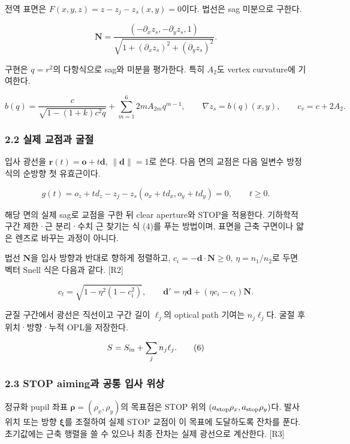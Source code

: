 \documentclass[
  a4paper,
]{article}
\begin{document}
전역 표면은 \(F(x,y,z)=z-z_j-z_s(x,y)=0\)이다. 법선은 sag 미분으로
구한다.

\[
\mathbf N=\frac{(-\partial_xz_s,-\partial_yz_s,1)}
 {\sqrt{1+(\partial_xz_s)^2+(\partial_yz_s)^2}}.
\tag{2}
\]

구현은 \(q=r^2\)의 다항식으로 sag와 미분을 평가한다. 특히 \(A_2\)도
vertex curvature에 기여한다.

\[
b(q)=\frac{c}{\sqrt{1-(1+k)c^2q}}
 +\sum_{m=1}^{6}2mA_{2m}q^{m-1},\qquad
\nabla z_s=b(q)(x,y),\qquad c_v=c+2A_2.
\tag{3}
\]

\hypertarget{uxc2e4uxc81c-uxad50uxc810uxacfc-uxad74uxc808}{%
\subsubsection{2.2 실제 교점과
굴절}\label{uxc2e4uxc81c-uxad50uxc810uxacfc-uxad74uxc808}}

입사 광선을 \(\mathbf r(t)=\mathbf o+t\mathbf d\), \(\|\mathbf d\|=1\)로
쓴다. 다음 면의 교점은 다음 일변수 방정식의 순방향 첫 유효근이다.

\[
g(t)=o_z+td_z-z_j-z_s(o_x+td_x,o_y+td_y)=0,
\qquad t\ge0.
\tag{4}
\]

해당 면의 실제 sag로 교점을 구한 뒤 clear aperture와 STOP을 적용한다.
기하학적 구간 제한·근 분리·수치 근 찾기는 식 (4)를 푸는 방법이며, 표면을
근축 구면이나 얇은 렌즈로 바꾸는 과정이 아니다.

법선 \(\mathbf N\)을 입사 방향과 반대로 향하게 정렬하고,
\(c_i=-\mathbf d\cdot\mathbf N\ge0\), \(\eta=n_1/n_2\)로 두면 벡터 Snell
식은 다음과 같다. {[}R2{]}

\[
c_t=\sqrt{1-\eta^2(1-c_i^2)},\qquad
\mathbf d'=\eta\mathbf d+(\eta c_i-c_t)\mathbf N.
\tag{5}
\]

균질 구간에서 광선은 직선이고 구간 길이 \(\ell_j\)의 optical path 기여는
\(n_j\ell_j\)다. 굴절 후 위치·방향·누적 OPL을 저장한다.

\[
S=S_{\rm in}+\sum_jn_j\ell_j.
\tag{6}
\]

\hypertarget{stop-aiminguxacfc-uxacf5uxd1b5-uxc785uxc0ac-uxc704uxc0c1}{%
\subsubsection{2.3 STOP aiming과 공통 입사
위상}\label{stop-aiminguxacfc-uxacf5uxd1b5-uxc785uxc0ac-uxc704uxc0c1}}

정규화 pupil 좌표 \(\boldsymbol\rho=(\rho_x,\rho_y)\)의 목표점은 STOP
위의 \((a_{\rm stop}\rho_x,a_{\rm stop}\rho_y)\)다. 발사 위치 또는 방향
\(\boldsymbol\xi\)를 조절하여 실제 STOP 교점이 이 목표에 도달하도록
잔차를 푼다. 초기값에는 근축 행렬을 쓸 수 있으나 최종 잔차는 실제
광선으로 계산한다. {[}R3{]}
\end{document}
